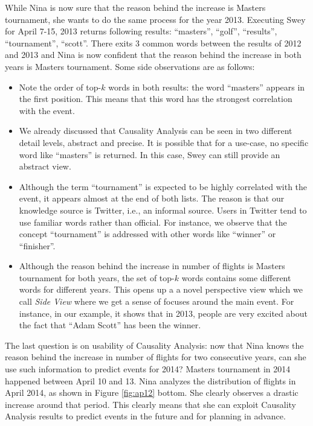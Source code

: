 \documentclass[conference]{IEEEtran}
\begin{document}
While Nina is now sure that the reason behind the increase is Masters tournament, she wants to do the same process for the year 2013. Executing {\sc Swey} for April 7-15, 2013 returns following results: ``masters'', ``golf'', ``results'', ``tournament'', ``scott''. There exits 3 common words between the results of 2012 and 2013 and Nina is now confident that the reason behind the increase in both years is Masters tournament. Some side observations are as follows:

\begin{itemize}
\item Note the order of top-$k$ words in both results: the word ``masters'' appears in the first position. This means that this word has the strongest correlation with the event.
\item We already discussed that Causality Analysis can be seen in two different detail levels, abstract and precise. It is possible that for a use-case, no specific word like ``masters'' is returned. In this case, {\sc Swey} can still provide an abstract view.
\item Although the term ``tournament'' is expected to be highly correlated with the event, it appears almost at the end of both lists. The reason is that our knowledge source is Twitter, i.e., an informal source. Users in Twitter tend to use familiar words rather than official. For instance, we observe that the concept ``tournament'' is addressed with other words like ``winner'' or ``finisher''.
\item Although the reason behind the increase in number of flights is Masters tournament for both years, the set of top-$k$ words contains some different words for different years. This opens up a a novel perspective view which we call {\em Side View} where we get a sense of focuses around the main event. For instance, in our example, it shows that in 2013, people are very excited about the fact that ``Adam Scott'' has been the winner. 
\end{itemize}

The last question is on usability of Causality Analysis: now that Nina knows the reason behind the increase in number of flights for two consecutive years, can she use such information to predict events for 2014? Masters tournament in 2014 happened between April 10 and 13. Nina analyzes the distribution of flights in April 2014, as shown in Figure \ref{fig:ap12} bottom. She clearly observes a drastic increase around that period. This clearly means that she can exploit Causality Analysis results to predict events in the future and for planning in advance.
\end{document}
